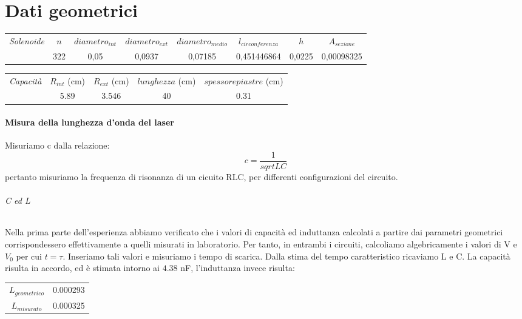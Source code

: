 

\chapter{Dati geometrici}
\begin{center}
\begin{tabular}{|c|c|c|c|c|c|c|c|}
\midrule
\textit{Solenoide} & $n$ & $diametro_{int}$ & $diametro_{ext}$ & $diametro_{medio}$ & $l_{circonferenza}$ & $h$ & $A_{sezione}$  \\
		   & 322 & 0,05	 & 0,0937  & 0,07185 & 0,451446864 & 0,0225 &	0,00098325 \\
 \midrule
\end{tabular}
\end{center}


\begin{center}
\begin{tabular}{|c|c|c|c|c|}
\midrule
\textit{Capacità} & $R_{int}$ (cm) & $R_{ext}$ (cm) & $lunghezza$ (cm) & $spessore piastre$ (cm)\\
   & 5.89 & 3.546  & 40  & 0.31 \\

 \midrule
\end{tabular}
\end{center}

\subsubsection{Misura della lunghezza d'onda del laser}

Misuriamo c dalla relazione:
\begin{equation}
 c=\frac{1}{sqrt{LC}}
\end{equation}
pertanto misuriamo la frequenza di risonanza di un cicuito RLC, per differenti configurazioni del circuito.

\subparagraph*{C ed L}
Nella prima parte dell'esperienza abbiamo verificato che i valori di capacità ed induttanza calcolati a partire dai parametri geometrici corrispondessero effettivamente a quelli misurati in laboratorio. 
Per tanto, in entrambi i circuiti, calcoliamo algebricamente i valori di V e $V_{0}$ per cui $t = \tau$. Inseriamo tali valori e misuriamo i tempo di scarica. Dalla stima del tempo caratteristico ricaviamo L e C. La capacità risulta in accordo, ed è stimata intorno ai $4.38$ nF, l'induttanza invece risulta:

\begin{center}
\begin{tabular}{c c}
$L_{geometrico}$  & 0.000293\\
$L_{misurato}$ & 0.000325\\
\end{tabular}
\end{center}

